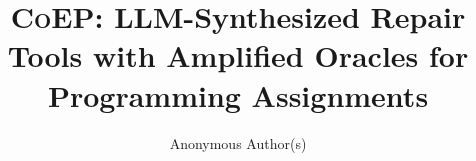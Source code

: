 \documentclass[acmsmall,screen,review,anonymous,nonacm]{acmart}
\begin{document}
\title{\textsc{CoEP}: LLM-Synthesized Repair Tools with Amplified Oracles for Programming Assignments}

\author{Anonymous Author(s)}

\end{document}
